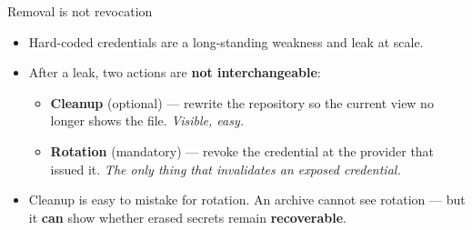 \documentclass[aspectratio=169]{beamer}
\begin{document}
\begin{frame}{Removal is not revocation}
    \begingroup
    \begin{itemize}\setlength{\itemsep}{1em}
        \item Hard-coded credentials are a long-standing weakness and leak at scale.
        \item After a leak, two actions are \textbf{not interchangeable}:
              \begin{itemize}
                  \item \textbf{Cleanup} (optional) --- rewrite the repository so the
                        current view no longer shows the file. \emph{Visible, easy.}
                  \item \textbf{Rotation} (mandatory) --- revoke the credential at the
                        provider that issued it. \emph{The only thing that invalidates
                        an exposed credential.}
              \end{itemize}
        \item Cleanup is easy to mistake for rotation. An archive cannot see rotation ---
              but it \textbf{can} show whether erased secrets remain \textbf{recoverable}.
    \end{itemize}
    \endgroup
\end{frame}
\end{document}
